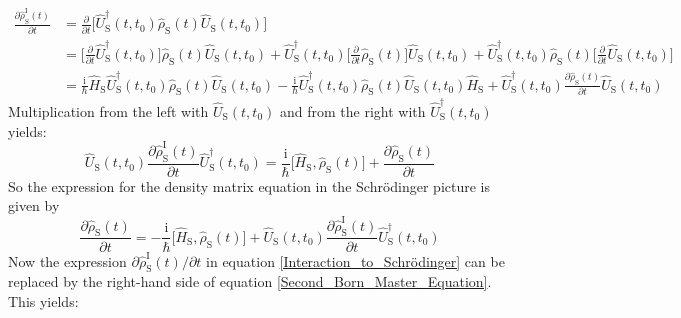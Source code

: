 \documentclass[9pt]{report}
\begin{document}
\begin{align}
\frac{\partial\hat{\rho}^{\mathrm{I}}_{\mathrm{S}}(t)}{\partial t} &= \frac{\partial}{\partial t}\Big[\hat{U}_{\mathrm{S}}^{\dagger}(t,t_0)\hat{\rho}_{\mathrm{S}}(t)\hat{U}_{\mathrm{S}}(t,t_0)\Big]\\
&= \Big[\frac{\partial}{\partial t}\hat{U}_{\mathrm{S}}^{\dagger}(t,t_0)\Big]\hat{\rho}_{\mathrm{S}}(t)\hat{U}_{\mathrm{S}}(t,t_0) + \hat{U}^{\dagger}_{\mathrm{S}}(t,t_0)\Big[\frac{\partial}{\partial t}\hat{\rho}_{\mathrm{S}}(t)\Big]\hat{U}_{\mathrm{S}}(t,t_0) + \hat{U}_{\mathrm{S}}^{\dagger}(t,t_0)\hat{\rho}_{\mathrm{S}}(t)\Big[\frac{\partial}{\partial t}\hat{U}_{\mathrm{S}}(t,t_0)\Big]\\
&= \frac{\mathrm{i}}{\hbar}\hat{H}_{\mathrm{S}}\hat{U}_{\mathrm{S}}^{\dagger}(t,t_0)\hat{\rho}_{\mathrm{S}}(t)\hat{U}_{\mathrm{S}}(t,t_0)-\frac{\mathrm{i}}{\hbar}\hat{U}_{\mathrm{S}}^{\dagger}(t,t_0)\hat{\rho}_{\mathrm{S}}(t)\hat{U}_{\mathrm{S}}(t,t_0)\hat{H}_{\mathrm{S}} + \hat{U}_{\mathrm{S}}^{\dagger}(t,t_0)\frac{\partial\hat{\rho}_{\mathrm{S}}(t)}{\partial t}\hat{U}_{\mathrm{S}}(t,t_0)
\end{align}
Multiplication from the left with $\hat{U}_{\mathrm{S}}(t,t_0)$ and from the right with $\hat{U}_{\mathrm{S}}^{\dagger}(t,t_0)$ yields:
\begin{equation}
\hat{U}_{\mathrm{S}}(t,t_0)\frac{\partial\hat{\rho}_{\mathrm{S}}^{\mathrm{I}}(t)}{\partial t}\hat{U}_{\mathrm{S}}^{\dagger}(t,t_0) = \frac{\mathrm{i}}{\hbar}\big[\hat{H}_{\mathrm{S}},\hat{\rho}_{\mathrm{S}}(t)\big] + \frac{\partial\hat{\rho}_{\mathrm{S}}(t)}{\partial t}
\end{equation}
So the expression for the density matrix equation in the Schrödinger picture is given by
\begin{equation}
\frac{\partial\hat{\rho}_{\mathrm{S}}(t)}{\partial t} = -\frac{\mathrm{i}}{\hbar}\big[\hat{H}_{\mathrm{S}},\hat{\rho}_{\mathrm{S}}(t)\big] + \hat{U}_{\mathrm{S}}(t,t_0)\frac{\partial\hat{\rho}_{\mathrm{S}}^{\mathrm{I}}(t)}{\partial t}\hat{U}_{\mathrm{S}}^{\dagger}(t,t_0)\label{Interaction_to_Schrödinger}
\end{equation}
Now the expression $\partial\hat{\rho}_{\mathrm{S}}^{\mathrm{I}}(t)/\partial t$ in equation \eqref{Interaction_to_Schrödinger} can be replaced by the right-hand side of equation \eqref{Second_Born_Master_Equation}. This yields:
\end{document}
